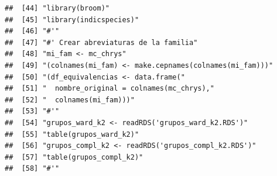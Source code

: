 \documentclass[11pt,]{article}
\begin{document}
\begin{verbatim}
##  [44] "library(broom)"                                                                                                                                                        
##  [45] "library(indicspecies)"                                                                                                                                                 
##  [46] "#'"                                                                                                                                                                    
##  [47] "#' Crear abreviaturas de la familia"                                                                                                                                   
##  [48] "mi_fam <- mc_chrys"                                                                                                                                                    
##  [49] "(colnames(mi_fam) <- make.cepnames(colnames(mi_fam)))"                                                                                                                 
##  [50] "(df_equivalencias <- data.frame("                                                                                                                                      
##  [51] "  nombre_original = colnames(mc_chrys),"                                                                                                                               
##  [52] "  colnames(mi_fam)))"                                                                                                                                                  
##  [53] "#'"                                                                                                                                                                    
##  [54] "grupos_ward_k2 <- readRDS('grupos_ward_k2.RDS')"                                                                                                                       
##  [55] "table(grupos_ward_k2)"                                                                                                                                                 
##  [56] "grupos_compl_k2 <- readRDS('grupos_compl_k2.RDS')"                                                                                                                     
##  [57] "table(grupos_compl_k2)"                                                                                                                                                
##  [58] "#'"                                                                                                                                                                    

\end{verbatim}
\end{document}
